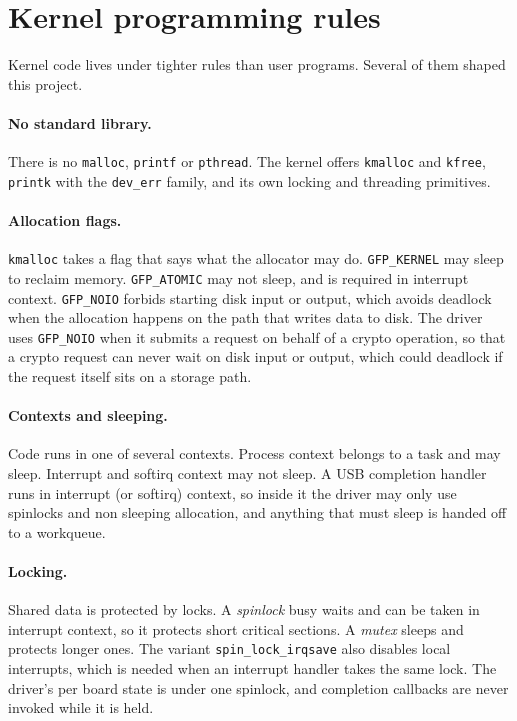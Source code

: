\documentclass[11pt,a4paper,oneside]{report}
\newcommand{\code}[1]{\texttt{\small #1}}
\begin{document}
\section{Kernel programming rules}

Kernel code lives under tighter rules than user programs. Several of them shaped this project.

\paragraph{No standard library.} There is no \code{malloc}, \code{printf} or \code{pthread}. The kernel offers \code{kmalloc} and \code{kfree}, \code{printk} with the \code{dev\_err} family, and its own locking and threading primitives.

\paragraph{Allocation flags.} \code{kmalloc} takes a flag that says what the allocator may do. \code{GFP\_KERNEL} may sleep to reclaim memory. \code{GFP\_ATOMIC} may not sleep, and is required in interrupt context. \code{GFP\_NOIO} forbids starting disk input or output, which avoids deadlock when the allocation happens on the path that writes data to disk. The driver uses \code{GFP\_NOIO} when it submits a request on behalf of a crypto operation, so that a crypto request can never wait on disk input or output, which could deadlock if the request itself sits on a storage path.

\paragraph{Contexts and sleeping.} Code runs in one of several contexts. Process context belongs to a task and may sleep. Interrupt and softirq context may not sleep. A USB completion handler runs in interrupt (or softirq) context, so inside it the driver may only use spinlocks and non sleeping allocation, and anything that must sleep is handed off to a workqueue.

\paragraph{Locking.} Shared data is protected by locks. A \emph{spinlock} busy waits and can be taken in interrupt context, so it protects short critical sections. A \emph{mutex} sleeps and protects longer ones. The variant \code{spin\_lock\_irqsave} also disables local interrupts, which is needed when an interrupt handler takes the same lock. The driver's per board state is under one spinlock, and completion callbacks are never invoked while it is held.
\end{document}
